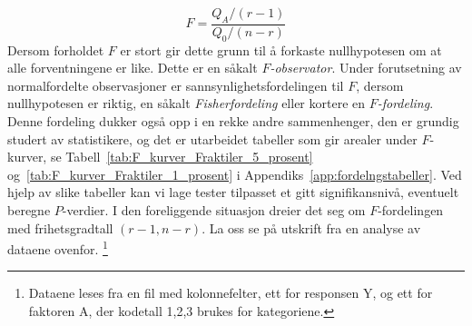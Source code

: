 \[ F=\frac{Q_A/(r-1)}{Q_0/(n-r)} \]
Dersom forholdet $F$ er stort gir dette grunn til å forkaste 
nullhypotesen om at alle forventningene er like.  Dette er en såkalt
{\em $F$-observator}. Under forutsetning av
normalfordelte observasjoner er sannsynlighetsfordelingen til $F$, dersom
nullhypotesen er riktig, en såkalt {\em Fisherfordeling} eller kortere
en {\em $F$-fordeling}.  Denne fordeling dukker også opp i en rekke
andre sammenhenger, den er grundig studert av statistikere, og det er
utarbeidet tabeller som gir arealer under $F$-kurver, 
se Tabell~\ref{tab:F_kurver_Fraktiler_5_prosent} og~\ref{tab:F_kurver_Fraktiler_1_prosent} 
i Appendiks~\ref{app:fordelngstabeller}.
Ved hjelp av slike tabeller kan vi lage tester tilpasset et gitt
 signifikansnivå, eventuelt beregne $P$-verdier. I den foreliggende
situasjon dreier det seg om $F$-fordelingen med frihetsgradtall
$(r - 1, n - r)$. La oss se på utskrift fra en analyse av dataene ovenfor.
\footnote{ Dataene leses fra en fil med kolonnefelter, ett for responsen Y,
og ett for faktoren A, der kodetall 1,2,3 brukes for kategoriene.} 
\begin{center}  \end{center}

